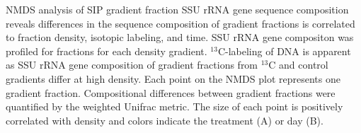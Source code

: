 NMDS analysis of SIP gradient fraction SSU rRNA gene sequence composition reveals
differences in the sequence composition of gradient fractions is correlated to
fraction density, isotopic labeling, and time. SSU rRNA gene compositon was
profiled for fractions for each density gradient. $^{13}$C-labeling of DNA is
apparent as SSU rRNA gene composition of gradient fractions from $^{13}$C and
control gradients differ at high density. Each point on the NMDS plot
represents one gradient fraction. Compositional differences between gradient
fractions were quantified by the weighted Unifrac metric. The size of each
point is positively correlated with density and colors indicate the treatment (A)
or day (B).
